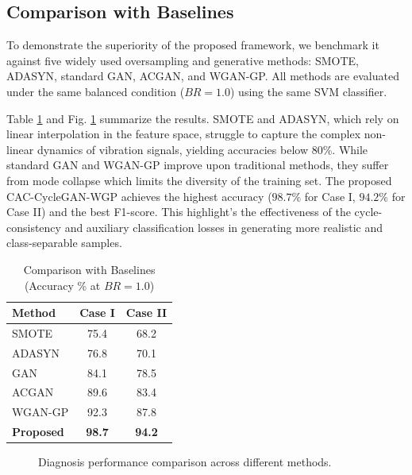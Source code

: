 \subsection{Comparison with Baselines}
To demonstrate the superiority of the proposed framework, we benchmark it against five widely used oversampling and generative methods: SMOTE, ADASYN, standard GAN, ACGAN, and WGAN-GP. All methods are evaluated under the same balanced condition ($BR=1.0$) using the same SVM classifier.

Table \ref{tab:comparison} and Fig. \ref{fig:comp_chart} summarize the results. SMOTE and ADASYN, which rely on linear interpolation in the feature space, struggle to capture the complex non-linear dynamics of vibration signals, yielding accuracies below $80\%$. While standard GAN and WGAN-GP improve upon traditional methods, they suffer from mode collapse which limits the diversity of the training set. The proposed CAC-CycleGAN-WGP achieves the highest accuracy ($98.7\%$ for Case I, $94.2\%$ for Case II) and the best F1-score. This highlight's the effectiveness of the cycle-consistency and auxiliary classification losses in generating more realistic and class-separable samples.

\begin{table}[htbp]
\centering
\caption{Comparison with Baselines (Accuracy \% at $BR=1.0$)}
\label{tab:comparison}
\begin{tabular}{lcc}
\hline
\textbf{Method} & \textbf{Case I} & \textbf{Case II} \\ \hline
SMOTE \cite{chawla2002smote} & 75.4 & 68.2 \\
ADASYN \cite{he2008adasyn} & 76.8 & 70.1 \\
GAN \cite{goodfellow2014gan} & 84.1 & 78.5 \\
ACGAN \cite{odena2017acgan} & 89.6 & 83.4 \\
WGAN-GP \cite{gulrajani2017wgangp} & 92.3 & 87.8 \\
\textbf{Proposed} & \textbf{98.7} & \textbf{94.2} \\
\hline
\end{tabular}
\end{table}

\begin{figure}[htbp]
\centering
\caption{Diagnosis performance comparison across different methods.}
\label{fig:comp_chart}
\end{figure}

